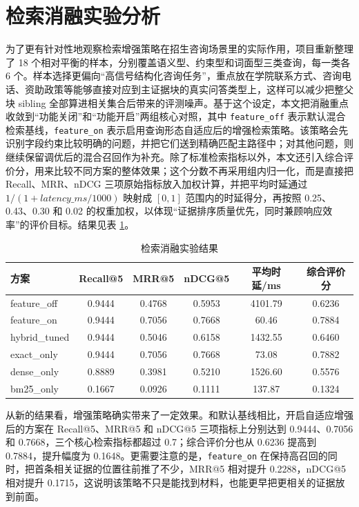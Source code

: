 \documentclass[UTF8,zihao=-4,oneside]{ctexbook}
\numberwithin{equation}{chapter}
\begin{document}
\section{检索消融实验分析}
为了更有针对性地观察检索增强策略在招生咨询场景里的实际作用，项目重新整理了 18 个相对平衡的样本，分别覆盖语义型、约束型和词面型三类查询，每一类各 6 个。样本选择更偏向“高信号结构化咨询任务”，重点放在学院联系方式、咨询电话、资助政策等能够直接对应到主证据块的真实问答类型上，这样可以减少把整父块 sibling 全部算进相关集合后带来的评测噪声。基于这个设定，本文把消融重点收敛到“功能关闭”和“功能开启”两组核心对照，其中 \texttt{feature\_off} 表示默认混合检索基线，\texttt{feature\_on} 表示启用查询形态自适应后的增强检索策略。该策略会先识别字段约束比较明确的问题，并把它们送到精确匹配主路径中；对其他问题，则继续保留调优后的混合召回作为补充。除了标准检索指标以外，本文还引入综合评价分，用来比较不同方案的整体效果；这个分数不再采用组内归一化，而是直接把 Recall、MRR、nDCG 三项原始指标放入加权计算，并把平均时延通过 $1/(1+\textit{latency\_ms}/1000)$ 映射成 $[0,1]$ 范围内的时延得分，再按照 0.25、0.43、0.30 和 0.02 的权重加权，以体现“证据排序质量优先，同时兼顾响应效率”的评价目标。结果见表 \ref{tab:ablation}。

\begin{table}[H]
  \centering
  \caption{检索消融实验结果}
  \label{tab:ablation}
  \begin{tabular}{lccccc}
    \toprule
    方案 & Recall@5 & MRR@5 & nDCG@5 & 平均时延/ms & 综合评价分 \\
    \midrule
    feature\_off & 0.9444 & 0.4768 & 0.5953 & 4101.79 & 0.6236 \\
    feature\_on & 0.9444 & 0.7056 & 0.7668 & 60.46 & 0.7884 \\
    hybrid\_tuned & 0.9444 & 0.5046 & 0.6158 & 1432.55 & 0.6460 \\
    exact\_only & 0.9444 & 0.7056 & 0.7668 & 73.08 & 0.7882 \\
    dense\_only & 0.8889 & 0.3981 & 0.5210 & 1526.60 & 0.5576 \\
    bm25\_only & 0.1667 & 0.0926 & 0.1111 & 137.87 & 0.1324 \\
    \bottomrule
  \end{tabular}
\end{table}

从新的结果看，增强策略确实带来了一定效果。和默认基线相比，开启自适应增强后的方案在 Recall@5、MRR@5 和 nDCG@5 三项指标上分别达到 0.9444、0.7056 和 0.7668，三个核心检索指标都超过 0.7；综合评价分也从 0.6236 提高到 0.7884，提升幅度为 0.1648。更需要注意的是，\texttt{feature\_on} 在保持高召回的同时，把首条相关证据的位置往前推了不少，MRR@5 相对提升 0.2288，nDCG@5 相对提升 0.1715，这说明该策略不只是能找到材料，也能更早把更相关的证据放到前面。
\end{document}
